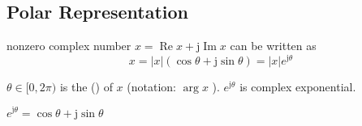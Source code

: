 \subsection{Polar Representation}

\begin{theorem}
    nonzero complex number $ x=\operatorname{Re} x+\mathrm{j} \operatorname{Im} x $ can be written as
\begin{equation}
x=|x|(\cos \theta+\mathrm{j} \sin \theta)=|x| e^{\mathrm{j} \theta}
\end{equation}

$ \theta \in[0,2 \pi) $ is the  () of $ x $ (notation: $ \arg x $ ). $ e^{\mathrm{j} \theta} $ is complex exponential.
\end{theorem}

\begin{theorem}
    $ e^{\mathrm{j} \theta}=\cos \theta+\mathrm{j} \sin \theta $
\end{theorem}

